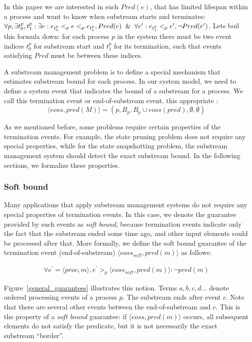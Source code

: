 In this paper we are interested in such $Pred(e)$, that has limited lifespan within a process and want to know when substream starts and terminates: $\forall p, \exists t_0^p, t_1^p: \exists e: e_{t_0^p} <_p e <_p e_{t_1^p}, Pred(e) \And \forall e': e_{t_1^p} <_p e', \neg Pred(e')$. Lets boil this formula down: for each process $p$ in the system there must be two event indices $t_0^p$ for substream start and $t_1^p$ for its termination, such that events satisfying $Pred$ must be between these indices. 

A substream management problem is to define a special mechanism that estimates substream bound for each process. In our system model, we need to define a system event that indicates the bound of a substream for a process. We call this termination event or end-of-substream event, this appropriate :
\begin{equation}
  \langle eoss, pred(M)\rangle = (p, B_p, B_p\cup eoss(pred), \emptyset, \emptyset)  
\end{equation}

As we mentioned before, some problems require certain properties of the termination events. For example, the state pruning problem does not require any special properties, while for the state snapshotting problem, the substream management system should detect the exact substream bound. In the following sections, we formalize these properties. 

\subsubsection{Soft bound}

Many applications that apply substream management systems do not require any special properties of termination events. In this case, we denote the guarantee provided by such events as {\em soft bound}, because termination events indicate only the fact that the substream ended some time ago, and other input elements could be processed after that. More formally, we define the soft bound guarantee of the termination event (end-of-substream) $\langle eoss_{soft}, pred(m)\rangle$ as follows:

\begin{align*}
\forall e^{'} = \langle proc,m\rangle, e^{'} >_p \langle eoss_{soft}, pred(m)\rangle : \neg pred(m)
\end{align*}

Figure~\ref{general_guarantees} illustrates this notion. Terms $a,b,c,d...$ denote ordered processing events of a process $p$. The substream ends after event $c$. Note that there are several other events between the end-of-substream and $c$. This is the property of a {\em soft bound} guarantee: if $\langle eoss, pred(m)\rangle$ occurs, all subsequent elements do not satisfy the predicate, but it is not necessarily the exact substream ``border''.

